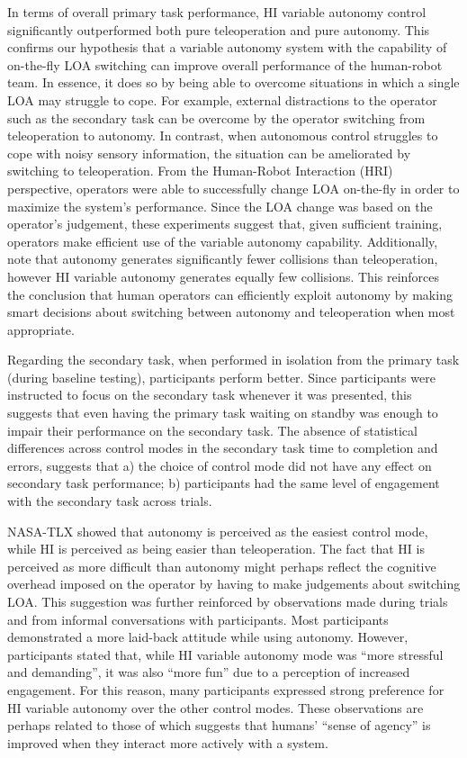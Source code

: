 \documentclass[a4paper,12pt,oneside,openright]{bhamthesis}
\begin{document}
In terms of overall primary task performance, HI variable autonomy control significantly outperformed both pure teleoperation and pure autonomy. This confirms our hypothesis that a variable autonomy system with the capability of on-the-fly LOA switching can improve overall performance of the human-robot team. In essence, it does so by being able to overcome situations in which a single LOA may struggle to cope. For example, external distractions to the operator such as the secondary task can be overcome by the operator switching from teleoperation to autonomy. In contrast, when autonomous control struggles to cope with noisy sensory information, the situation can be ameliorated by switching to teleoperation. From the Human-Robot Interaction (HRI) perspective, operators were able to successfully change LOA on-the-fly in order to maximize the system's performance. Since the LOA change was based on the operator's judgement, these experiments suggest that, given sufficient training, operators make efficient use of the variable autonomy capability. Additionally, note that autonomy generates significantly fewer collisions than teleoperation, however HI variable autonomy generates equally few collisions. This reinforces the conclusion that human operators can efficiently exploit autonomy by making smart decisions about switching between autonomy and teleoperation when most appropriate. 

Regarding the secondary task, when performed in isolation from the primary task (during baseline testing), participants perform better. Since participants were instructed to focus on the secondary task whenever it was presented, this suggests that even having the primary task waiting on standby was enough to impair their performance on the secondary task. The absence of statistical differences across control modes in the secondary task time to completion and errors, suggests that a) the choice of control mode did not have any effect on secondary task performance; b) participants had the same level of engagement with the secondary task across trials.

NASA-TLX showed that autonomy is perceived as the easiest control mode, while HI is perceived as being easier than teleoperation. The fact that HI is perceived as more difficult than autonomy might perhaps reflect the cognitive overhead imposed on the operator by having to make judgements about switching LOA. This suggestion was further reinforced by observations made during trials and from informal conversations with participants. Most participants demonstrated a more laid-back attitude while using autonomy. However, participants stated that, while HI variable autonomy mode was ``more stressful and demanding'', it was also ``more fun'' due to a perception of increased engagement. For this reason, many participants expressed strong preference for HI variable autonomy over the other control modes. These observations are perhaps related to those of \cite{Wen2015} which suggests that humans' ``sense of agency'' is improved when they interact more actively with a system.
\end{document}
